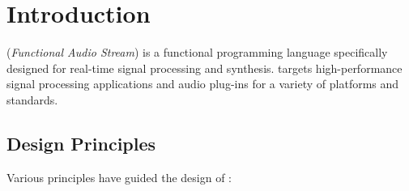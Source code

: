 \documentclass[a4paper,10pt]{book}
\begin{document}
\setlength{\parindent}{0pt}
\setlength{\parskip}{1ex plus 0.5ex minus 0.2ex}

\maketitle

\tableofcontents

\chapter{Introduction}

\faust (\textit{Functional Audio Stream}) is a functional programming language specifically designed for real-time signal processing and synthesis.  \faust targets high-performance signal processing applications and audio plug-ins for a variety of platforms and standards. 

\section{Design Principles} 

Various principles have guided the design of \faust :
\end{document}
